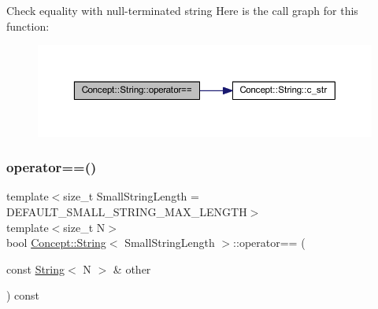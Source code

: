 Check equality with null-\/terminated string Here is the call graph for this function\+:\nopagebreak
\begin{figure}[H]
\begin{center}
\leavevmode
\includegraphics[width=350pt]{class_concept_1_1_string_a93eecf5bf6eeab17e773126bc83bc63a_cgraph}
\end{center}
\end{figure}
\mbox{\label{class_concept_1_1_string_a2359210adcec96fe1923c13616594686}} 
\subsubsection{\texorpdfstring{operator==()}{operator==()}\hspace{0.1cm}{\footnotesize\ttfamily [2/2]}}
{\footnotesize\ttfamily template$<$size\+\_\+t Small\+String\+Length = D\+E\+F\+A\+U\+L\+T\+\_\+\+S\+M\+A\+L\+L\+\_\+\+S\+T\+R\+I\+N\+G\+\_\+\+M\+A\+X\+\_\+\+L\+E\+N\+G\+TH$>$ \\
template$<$size\+\_\+t N$>$ \\
bool \mbox{\hyperlink{class_concept_1_1_string}{Concept\+::\+String}}$<$ Small\+String\+Length $>$\+::operator== (\begin{DoxyParamCaption}\item[{const \mbox{\hyperlink{class_concept_1_1_string}{String}}$<$ N $>$ \&}]{other }\end{DoxyParamCaption}) const\hspace{0.3cm}{\ttfamily [inline]}}

